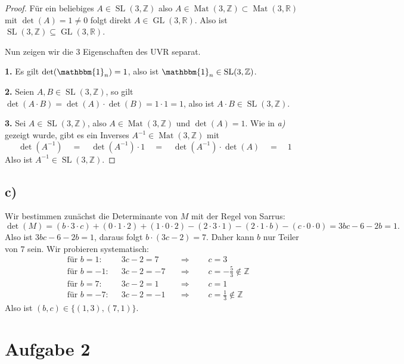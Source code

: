 \documentclass{article}
\newcommand{\ZZ}{\mathbb{Z}}
\newcommand{\RR}{\mathbb{R}}
\newcommand{\imp}{\mathbb{\Rightarrow}}
\newcommand{\eq}{\mathbb{\quad = \quad}}
\DeclareMathOperator{\Mat}{Mat}
\DeclareMathOperator{\GL}{GL}
\DeclareMathOperator{\SL}{SL}
\begin{document}
\begin{proof}
  Für ein beliebiges $A \in \SL(3,\ZZ)$ also $A \in \Mat(3,\ZZ) \subset \Mat(3,\RR)$
  mit $\det(A) = 1 \neq 0$ folgt direkt $A \in \GL(3,\RR)$.
  Also ist $\SL(3,\ZZ) \subseteq \GL(3,\RR)$.

  Nun zeigen wir die 3 Eigenschaften des UVR separat.

  \bigbreak
  \textbf{1.}
  Es gilt
  $\det(\mathbbm{1}_n) = 1$,
  also ist
  $\mathbbm{1}_n \in \SL(3,\ZZ)$.

  \bigbreak
  \textbf{2.}
  Seien
  $A,B \in \SL(3,\ZZ)$,
  so gilt
  $\det(A \cdot B) = \det(A) \cdot \det(B) = 1 \cdot 1 = 1$,
  also ist
  $A \cdot B \in \SL(3,\ZZ)$.

  \bigbreak
  \textbf{3.}
  Sei
  $A \in \SL(3,\ZZ)$,
  also
  $A \in \Mat(3,\ZZ)$ und $\det(A) = 1$.
  Wie in \textit{a)} gezeigt wurde, gibt es ein
  Inverses $A^{-1} \in \Mat(3,\ZZ)$ mit
  \[
    \det(A^{-1}) \eq \det(A^{-1}) \cdot 1 \eq
    \det(A^{-1}) \cdot \det(A) \eq 1
  \]
  Also ist $A^{-1} \in \SL(3,\ZZ)$.
\end{proof}
\newpage

\subsection*{c)}
Wir bestimmen zunächst die Determinante von $M$
mit der Regel von Sarrus:
\[
  \det(M) = (b \cdot 3 \cdot c) + (0 \cdot 1 \cdot 2)
  + (1 \cdot 0 \cdot 2) - (2 \cdot 3 \cdot 1) - (2 \cdot 1
  \cdot b) - (c \cdot 0 \cdot 0)
  = 3bc - 6 - 2b = 1.
\]
Also ist
$
  3bc - 6 - 2b = 1$,
daraus folgt
$b \cdot (3c-2) = 7.
$
Daher kann $b$ nur Teiler von $7$ sein.
Wir probieren systematisch:
\begin{align*}
   & \text{für $b = 1$:}  &  & 3c-2 = 7  &  & \imp\qquad c = 3                       \\
   & \text{für $b = -1$:} &  & 3c-2 = -7 &  & \imp\qquad c = -\frac{5}{3} \notin \ZZ \\
   & \text{für $b = 7$:}  &  & 3c-2 = 1  &  & \imp\qquad c = 1                       \\
   & \text{für $b = -7$:} &  & 3c-2 = -1 &  & \imp\qquad c = \frac{1}{3} \notin \ZZ
\end{align*}
Also ist $(b,c) \in \{(1,3),(7,1)\}$.



\newpage

\section*{Aufgabe 2}
\end{document}
